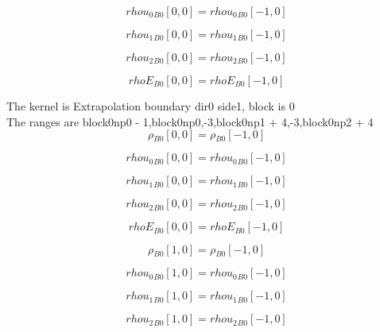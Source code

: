 \documentclass{article}
\begin{document}
\begin{dmath}{rhou_{0}{_{B0}}}[{0,0}] = {rhou_{0}{_{B0}}}[{-1,0}]\end{dmath}

\begin{dmath}{rhou_{1}{_{B0}}}[{0,0}] = {rhou_{1}{_{B0}}}[{-1,0}]\end{dmath}

\begin{dmath}{rhou_{2}{_{B0}}}[{0,0}] = {rhou_{2}{_{B0}}}[{-1,0}]\end{dmath}

\begin{dmath}{rhoE{_{B0}}}[{0,0}] = {rhoE{_{B0}}}[{-1,0}]\end{dmath}

\noindent The kernel is Extrapolation boundary dir0 side1, block is 0\\\noindent The ranges are block0np0 - 1,block0np0,-3,block0np1 + 4,-3,block0np2 + 4\\\begin{dmath}{\rho{_{B0}}}[{0,0}] = {\rho{_{B0}}}[{-1,0}]\end{dmath}

\begin{dmath}{rhou_{0}{_{B0}}}[{0,0}] = {rhou_{0}{_{B0}}}[{-1,0}]\end{dmath}

\begin{dmath}{rhou_{1}{_{B0}}}[{0,0}] = {rhou_{1}{_{B0}}}[{-1,0}]\end{dmath}

\begin{dmath}{rhou_{2}{_{B0}}}[{0,0}] = {rhou_{2}{_{B0}}}[{-1,0}]\end{dmath}

\begin{dmath}{rhoE{_{B0}}}[{0,0}] = {rhoE{_{B0}}}[{-1,0}]\end{dmath}

\begin{dmath}{\rho{_{B0}}}[{1,0}] = {\rho{_{B0}}}[{-1,0}]\end{dmath}

\begin{dmath}{rhou_{0}{_{B0}}}[{1,0}] = {rhou_{0}{_{B0}}}[{-1,0}]\end{dmath}

\begin{dmath}{rhou_{1}{_{B0}}}[{1,0}] = {rhou_{1}{_{B0}}}[{-1,0}]\end{dmath}

\begin{dmath}{rhou_{2}{_{B0}}}[{1,0}] = {rhou_{2}{_{B0}}}[{-1,0}]\end{dmath}
\end{document}
